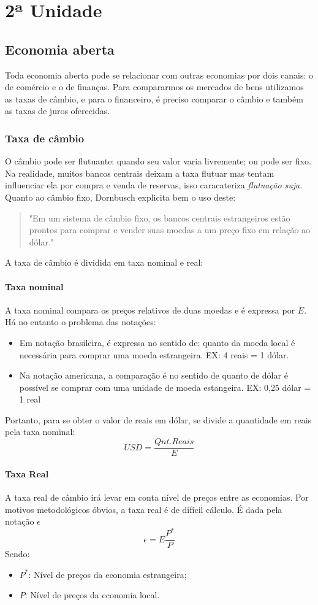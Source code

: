 \documentclass[12pt,a4paper,oneside,brazil]{abntex2}
\begin{document}
\chapter{2ª Unidade}
\section{Economia aberta}
Toda economia aberta pode se relacionar com outras economias por dois canais: o de comércio e o de finanças. Para compararmos os mercados de bens utilizamos as taxas de câmbio, e para o financeiro, é preciso comparar o câmbio e também as taxas de juros oferecidas.
\subsection{Taxa de câmbio}
O câmbio pode ser flutuante: quando seu valor varia livremente; ou pode ser fixo. Na realidade, muitos bancos centrais deixam a taxa flutuar mas tentam influenciar ela por compra e venda de reservas, isso caracateriza \emph{flutuação suja}. Quanto ao câmbio fixo, Dornbusch explicita bem o uso deste: 
\begin{quotation}
"Em um sistema de câmbio fixo, os bancos centrais estrangeiros estão prontos para
comprar e vender suas moedas a um preço fixo em relação ao dólar." \cite[p.274]{rudiger}
\end{quotation}
A taxa de câmbio é dividida em taxa nominal e real:
\subsubsection{Taxa nominal}
A taxa nominal compara os preços relativos de duas moedas e é expressa por $E$. Há no entanto o problema das notações:
\begin{itemize}
\item  Em notação brasileira, é expressa no sentido de: quanto da moeda local é necessária para comprar uma moeda estrangeira. EX: 4 reais = 1 dólar.
\item Na notação americana, a comparação é no sentido de quanto de dólar é possível se comprar com uma unidade de moeda estangeira. EX: 0,25 dólar = 1 real
\end{itemize}
Portanto, para se obter o valor de reais em dólar, se divide a quantidade em reais pela taxa nominal:
\[ USD = \frac{Qnt. Reais}{E}\]
\subsubsection{Taxa Real}
A taxa real de câmbio irá levar em conta  nível de preços entre as economias. Por motivos metodológicos óbvios, a taxa real é de difícil cálculo. É dada pela notação $\epsilon$
\[ \epsilon = E \frac{P^*}{P}\]
Sendo:
\begin{itemize}
\item $P^*$: Nível de preços da economia estrangeira;
\item $P$: Nível de preços da economia local.
\end{itemize}
\end{document}
